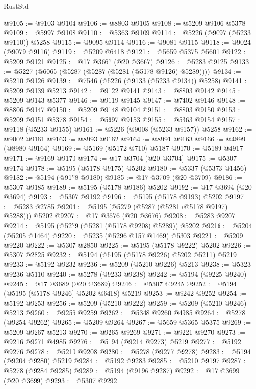 \begin{lexlean}{RustStd}
\begin{coremodule}
@9105 := @9103 @9104
@9106 := @8803 @9105
@9108 := @5209 @9106 @5378
@9109 := @5997 @9108
@9110 := @5363 @9109
@9114 := @5226 (@9097 (@5233 @9110)) @5258
@9115 := @9095 @9114
@9116 := @9081 @9115
@9118 := @9024 (@9079 @9116)
@9119 := @5209 @6418
@9121 := @5659 @5375 @5601
@9122 := @5209 @9121
@9125 := @17 @3667 (@20 @3667)
@9126 := @5283 @9125
@9133 := @5227 (@6065 (@5287 (@5287 (@5281 (@5178 @9126) @5289))))
@9134 := @5210 @9126
@9139 := @7546 (@5226 (@9133 (@5233 @9134)) @5258)
@9141 := @5209 @9139 @5213
@9142 := @9122 @9141
@9143 := @8803 @9142
@9145 := @5209 @9143 @5377
@9146 := @9119 @9145
@9147 := @7402 @9146
@9148 := @8806 @9147
@9150 := @5209 @9148 @9104
@9151 := @8803 @9150
@9153 := @5209 @9151 @5378
@9154 := @5997 @9153
@9155 := @5363 @9154
@9157 := @9118 (@5233 @9155)
@9161 := @5226 (@9008 (@5233 @9157)) @5258
@9162 := @9002 @9161
@9163 := @8993 @9162
@9164 := @8991 @9163
@9166 := @4899 (@8980 @9164)
@9169 := @5169 (@5172 @710) @5187
@9170 := @5189 @4917
@9171 := @9169 @9170
@9174 := @17 @3704 (@20 @3704)
@9175 := @5307 @9174
@9178 := @5195 (@5178 @9175) @5202
@9180 := @5337 (@5373 @1456)
@9182 := @5194 (@9178 @9180)
@9185 := @17 @3709 (@20 @3709)
@9186 := @5307 @9185
@9189 := @5195 (@5178 @9186) @5202
@9192 := @17 @3694 (@20 @3694)
@9193 := @5307 @9192
@9196 := @5195 (@5178 @9193) @5202
@9197 := @5283 @2785
@9204 := @5195 (@5279 (@5287 (@5281 (@5178 @9197) @5288))) @5202
@9207 := @17 @3676 (@20 @3676)
@9208 := @5283 @9207
@9214 := @5195 (@5279 (@5281 (@5178 @9208) @5289)) @5202
@9216 := @5204 (@5205 @1464)
@9220 := @5235 (@5296 @157 @1469) @5303
@9221 := @5209 @9220
@9222 := @5307 @2850
@9225 := @5195 (@5178 @9222) @5202
@9226 := @5307 @2825
@9232 := @5194 (@5195 (@5178 @9226) @5202 @5211) @5219
@9233 := @5192 @9232
@9236 := @5209 (@5210 @9226) @5213
@9238 := @5323 @9236 @5110
@9240 := @5278 (@9233 @9238)
@9242 := @5194 (@9225 @9240)
@9245 := @17 @3689 (@20 @3689)
@9246 := @5307 @9245
@9252 := @5194 (@5195 (@5178 @9246) @5202 @6418) @5219
@9253 := @9242 @9252
@9254 := @5192 @9253
@9256 := @5209 (@5210 @9222)
@9259 := @5209 (@5210 @9246) @5213
@9260 := @9256 @9259
@9262 := @5348 @9260 @4985
@9264 := @5278 (@9254 @9262)
@9265 := @5209 @9264
@9267 := @5659 @5365 @5375
@9269 := @5209 @9267 @5213
@9270 := @9265 @9269
@9271 := @9221 @9270
@9273 := @9216 @9271 @4985
@9276 := @5194 (@9214 @9273) @5219
@9277 := @5192 @9276
@9278 := @5210 @9208
@9280 := @5278 (@9277 @9278)
@9283 := @5194 (@9204 @9280) @5219
@9284 := @5192 @9283
@9285 := @5210 @9197
@9287 := @5278 (@9284 @9285)
@9289 := @5194 (@9196 @9287)
@9292 := @17 @3699 (@20 @3699)
@9293 := @5307 @9292

\end{coremodule}
\end{lexlean}
